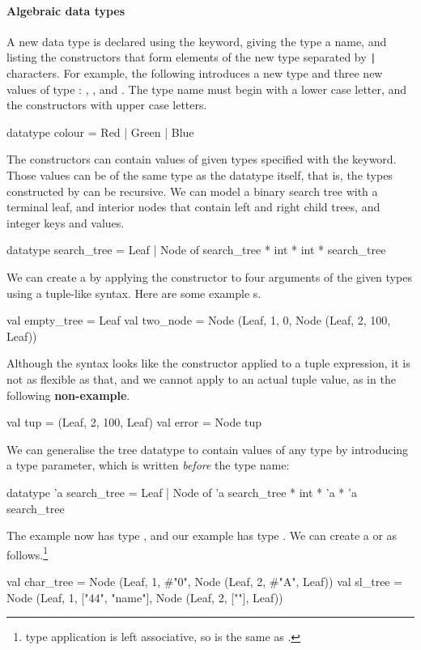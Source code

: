\documentclass[12pt,a4paper]{book}
\begin{document}
\paragraph{Algebraic data types}

A new data type is declared using the  keyword, giving the
type a name, and listing the constructors that form elements of the new type
separated by \texttt{|} characters. For example, the following introduces a new type  and three new values of type : , , and .
The type name must begin with a lower case letter, and the constructors with upper case letters.
\begin{smlcode}
datatype colour = Red | Green | Blue
\end{smlcode}

The constructors can contain values of given types specified with the
 keyword. Those values can be of the same type as the datatype
itself, that is, the types constructed by  can be recursive.
We can model a binary search tree with a terminal leaf, and interior nodes that
contain left and right child trees, and integer keys and values.
\begin{smlcode}
datatype search_tree =
  Leaf
| Node of search_tree * int * int * search_tree
\end{smlcode}
We can create a  by applying the constructor to four
arguments of the given types using a tuple-like syntax. Here are some example
s.
\begin{smlcode}
val empty_tree = Leaf
val two_node = Node (Leaf, 1, 0, Node (Leaf, 2, 100, Leaf))
\end{smlcode}
Although the syntax looks like the constructor applied to a tuple expression,
it is not as flexible as that, and we cannot apply  to an
actual tuple value, as in the following \textbf{non-example}.
\begin{smlcode}
val tup = (Leaf, 2, 100, Leaf)
val error = Node tup
\end{smlcode}

We can generalise the tree datatype to contain values of any type by
introducing a type parameter, which is written \emph{before} the type name:
\begin{smlcode}
datatype 'a search_tree =
  Leaf
| Node of 'a search_tree * int * 'a * 'a search_tree
\end{smlcode}
The  example now has type , and our
 example has type . We can create a
 or  as follows.\footnote{type application is left associative, so  is the same as .}
\begin{smlcode}
val char_tree = Node (Leaf, 1, #"0", Node (Leaf, 2, #"A", Leaf))
val sl_tree = Node (Leaf, 1, ["44", "name"], Node (Leaf, 2, [""], Leaf))
\end{smlcode}
\end{document}
